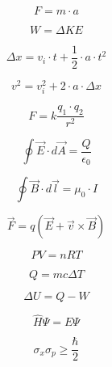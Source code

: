 \[
F = m \cdot a \quad
\]

\[
W = \Delta KE \quad
\]

\[
\Delta x = v_i \cdot t + \frac{1}{2} \cdot a \cdot t^2 \quad
\]

\[
v^2 = v_i^2 + 2 \cdot a \cdot \Delta x \quad
\]


\[
F = k \frac{q_1 \cdot q_2}{r^2} \quad
\]

\[
\oint \vec{E} \cdot d\vec{A} = \frac{Q}{\epsilon_0} \quad
\]

\[
\oint \vec{B} \cdot d\vec{l} = \mu_0 \cdot I \quad
\]

\[
\vec{F} = q (\vec{E} + \vec{v} \times \vec{B}) \quad
\]


\[
PV = nRT \quad
\]

\[
Q = mc\Delta T \quad
\]

\[
\Delta U = Q - W \quad
\]


\[
\hat{H}\Psi = E\Psi \quad
\]

\[
\sigma_x \sigma_p \geq \frac{\hbar}{2} \quad
\]

